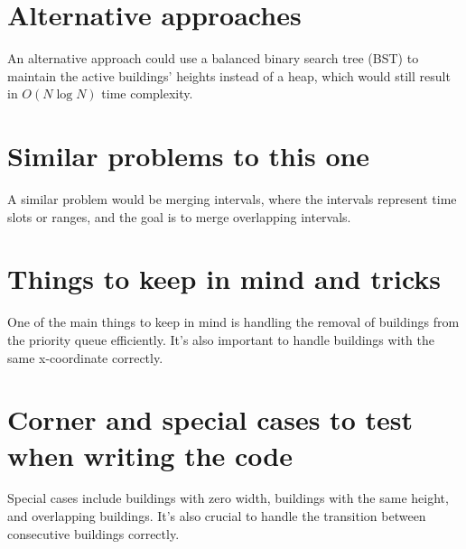 \section*{Alternative approaches}
An alternative approach could use a balanced binary search tree (BST) to maintain the active buildings' heights instead of a heap, which would still result in \(O(N \log N)\) time complexity. 

\section*{Similar problems to this one}
A similar problem would be merging intervals, where the intervals represent time slots or ranges, and the goal is to merge overlapping intervals. 

\section*{Things to keep in mind and tricks}
One of the main things to keep in mind is handling the removal of buildings from the priority queue efficiently. It's also important to handle buildings with the same x-coordinate correctly.

\section*{Corner and special cases to test when writing the code}
Special cases include buildings with zero width, buildings with the same height, and overlapping buildings. It's also crucial to handle the transition between consecutive buildings correctly.